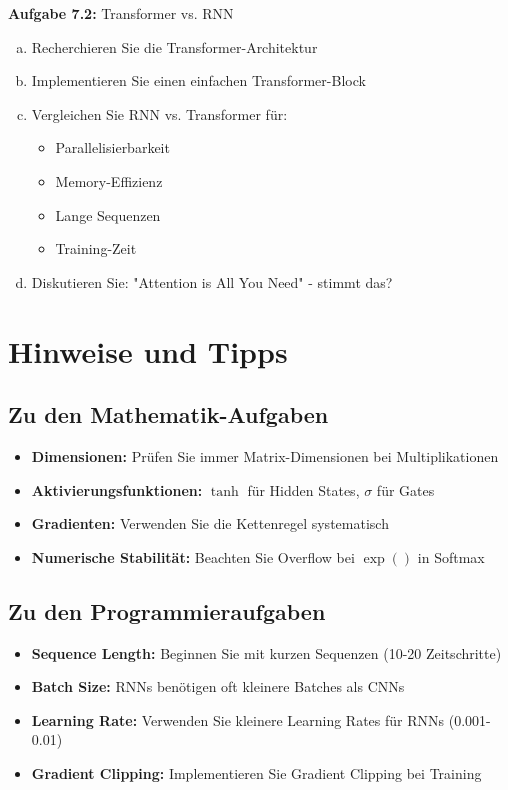 \documentclass[12pt,a4paper]{article}
\begin{document}
\textbf{Aufgabe 7.2:} Transformer vs. RNN

\begin{enumerate}[(a)]
    \item Recherchieren Sie die Transformer-Architektur
    \item Implementieren Sie einen einfachen Transformer-Block
    \item Vergleichen Sie RNN vs. Transformer für:
    \begin{itemize}
        \item Parallelisierbarkeit
        \item Memory-Effizienz
        \item Lange Sequenzen
        \item Training-Zeit
    \end{itemize}
    \item Diskutieren Sie: "Attention is All You Need" - stimmt das?
\end{enumerate}

\section*{Hinweise und Tipps}

\subsection*{Zu den Mathematik-Aufgaben}
\begin{itemize}
    \item \textbf{Dimensionen:} Prüfen Sie immer Matrix-Dimensionen bei Multiplikationen
    \item \textbf{Aktivierungsfunktionen:} $\tanh$ für Hidden States, $\sigma$ für Gates
    \item \textbf{Gradienten:} Verwenden Sie die Kettenregel systematisch
    \item \textbf{Numerische Stabilität:} Beachten Sie Overflow bei $\exp()$ in Softmax
\end{itemize}

\subsection*{Zu den Programmieraufgaben}
\begin{itemize}
    \item \textbf{Sequence Length:} Beginnen Sie mit kurzen Sequenzen (10-20 Zeitschritte)
    \item \textbf{Batch Size:} RNNs benötigen oft kleinere Batches als CNNs
    \item \textbf{Learning Rate:} Verwenden Sie kleinere Learning Rates für RNNs (0.001-0.01)
    \item \textbf{Gradient Clipping:} Implementieren Sie Gradient Clipping bei Training
\end{itemize}
\end{document}
